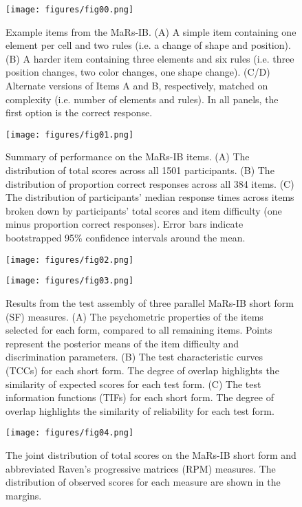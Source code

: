\documentclass[a4paper,man,natbib]{apa6}
\begin{document}
\begin{figure}
\centering
\texttt{[image: figures/fig00.png]}
\caption{\label{fig:fig00} Example items from the MaRs-IB. (A) A simple item containing one element per cell and two rules (i.e. a change of shape and position). (B) A harder item containing three elements and six rules (i.e. three position changes, two color changes, one shape change). (C/D) Alternate versions of Items A and B, respectively, matched on complexity (i.e. number of elements and rules). In all panels, the first option is the correct response.}
\end{figure}

\begin{figure}
\centering
\texttt{[image: figures/fig01.png]}
\caption{\label{fig:fig01}Summary of performance on the MaRs-IB items. (A) The distribution of total scores across all 1501 participants. (B) The distribution of proportion correct responses across all 384 items. (C) The distribution of participants' median response times across items broken down by participants' total scores and item difficulty (one minus proportion correct responses). Error bars indicate bootstrapped 95\% confidence intervals around the mean.}
\end{figure}

\begin{figure}
\centering
\texttt{[image: figures/fig02.png]}
\caption{\label{fig:fig02}}
\end{figure}
 
\begin{figure}
\centering
\texttt{[image: figures/fig03.png]}
\caption{\label{fig:fig03}Results from the test assembly of three parallel MaRs-IB short form (SF) measures. (A) The psychometric properties of the items selected for each form, compared to all remaining items. Points represent the posterior means of the item difficulty and discrimination  parameters. (B) The test characteristic curves (TCCs) for each short form. The degree of overlap highlights the similarity of expected scores for each test form. (C) The test information functions (TIFs) for each short form. The degree of overlap highlights the similarity of reliability for each test form.}
\end{figure}

\begin{figure}
\centering
\texttt{[image: figures/fig04.png]}
\caption{\label{fig:fig04}The joint distribution of total scores on the MaRs-IB short form and abbreviated Raven's progressive matrices (RPM) measures. The distribution of observed scores for each measure are shown in the margins.}
\end{figure}
\end{document}
